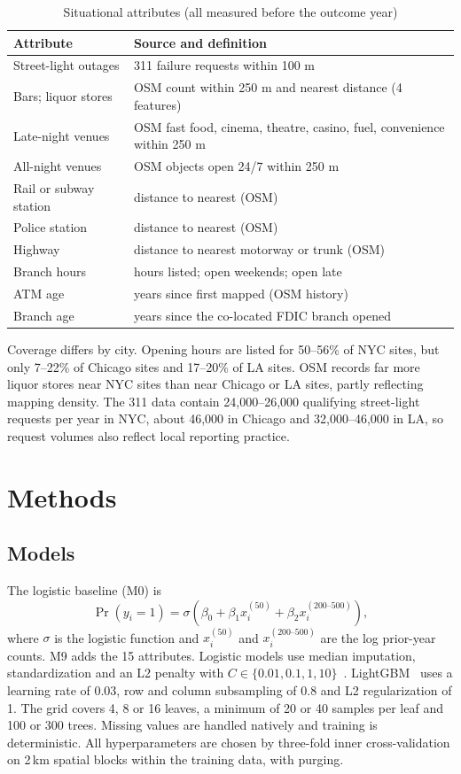 \documentclass[conference]{IEEEtran}
\begin{document}
\begin{table}[t]
\caption{Situational attributes (all measured before the outcome year)}
\label{tab:attr}
\centering
\begin{tabular}{p{3.6cm}p{3.9cm}}
\toprule
Attribute & Source and definition \\
\midrule
Street-light outages & 311 failure requests within 100 m \\
Bars; liquor stores & OSM count within 250 m and nearest distance (4 features) \\
Late-night venues & OSM fast food, cinema, theatre, casino, fuel, convenience within 250 m \\
All-night venues & OSM objects open 24/7 within 250 m \\
Rail or subway station & distance to nearest (OSM) \\
Police station & distance to nearest (OSM) \\
Highway & distance to nearest motorway or trunk (OSM) \\
Branch hours & hours listed; open weekends; open late \\
ATM age & years since first mapped (OSM history) \\
Branch age & years since the co-located FDIC branch opened~\cite{fdic} \\
\bottomrule
\end{tabular}
\end{table}

Coverage differs by city. Opening hours are listed for 50--56\% of NYC sites, but only 7--22\% of Chicago sites and
17--20\% of LA sites. OSM records far more liquor stores near NYC sites than near Chicago or LA sites, partly
reflecting mapping density. The 311 data contain 24,000--26,000 qualifying street-light requests per year in NYC,
about 46,000 in Chicago and 32,000--46,000 in LA, so request volumes also reflect local reporting practice.

\section{Methods}
\subsection{Models}
The logistic baseline (M0) is
\begin{equation}
\Pr(y_i=1)=\sigma\left(\beta_0+\beta_1 x_{i}^{(50)}+\beta_2 x_{i}^{(200\text{--}500)}\right),\label{eq:m0}
\end{equation}
where $\sigma$ is the logistic function and $x_i^{(50)}$ and $x_i^{(200\text{--}500)}$ are the log prior-year counts.
M9 adds the 15 attributes. Logistic models use median imputation, standardization and an L2 penalty with
$C\in\{0.01,0.1,1,10\}$~\cite{pedregosa2011}. LightGBM~\cite{ke2017} uses a learning rate of 0.03, row and column
subsampling of 0.8 and L2 regularization of 1. The grid covers 4, 8 or 16 leaves, a minimum of 20 or 40 samples per
leaf and 100 or 300 trees. Missing values are handled natively and training is deterministic. All hyperparameters
are chosen by three-fold inner cross-validation on 2\,km spatial blocks within the training data, with purging.
\end{document}
